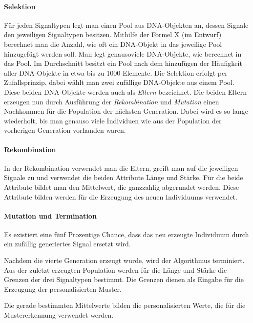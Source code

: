 \paragraph{Selektion}
F{\"u}r jeden Signaltypen legt man einen Pool aus DNA-Objekten an, dessen Signale den jeweiligen Signaltypen besitzen.
Mithilfe der Formel X (im Entwurf) berechnet man die Anzahl, wie oft ein DNA-Objekt in das jeweilige Pool hinzugef{\"u}gt werden soll. Man legt genausoviele DNA-Objekte, wie berechnet in das Pool. 
Im Durchschnitt besitzt ein Pool nach dem hinzuf{\"u}gen der H{\"a}ufigkeit aller DNA-Objekte in etwa bis zu 1000 Elemente.
Die Selektion erfolgt per Zufallsprinzip, dabei w{\"a}hlt man zwei zuf{\"a}llige DNA-Objekte aus einem Pool. Diese beiden DNA-Objekte werden auch als \textit{Eltern} bezeichnet. Die beiden Eltern erzeugen nun durch Ausf{\"u}hrung der \textit{Rekombination} und \textit{Mutation} einen Nachkommen f{\"u}r die Population der n{\"a}chsten Generation. Dabei wird es so lange wiederholt, bis man genauso viele Individuen wie aus der Population der vorherigen Generation vorhanden waren.

\paragraph{Rekombination}
In der Rekombination verwendet man die Eltern, greift man auf die jeweiligen Signale zu und verwendet die beiden Attribute L{\"a}nge und St{\"a}rke. 
F{\"u}r die beide Attribute bildet man den Mittelwert, die ganzzahlig abgerundet werden.
Diese Attribute bilden werden f{\"u}r die Erzeugung des neuen Individuums verwendet.

\paragraph{Mutation und Termination}
Es existiert eine f{\"u}nf Prozentige Chance, dass das neu erzeugte Individuum durch ein zuf{\"a}llig generiertes Signal ersetzt wird. 

Nachdem die vierte Generation erzeugt wurde, wird der Algorithmus terminiert. Aus der zuletzt erzeugten Population werden f{\"u}r die L{\"a}nge und St{\"a}rke die Grenzen der drei Signaltypen bestimmt. Die Grenzen dienen als Eingabe f{\"u}r die Erzeugung der personalisierten Muster. 


Die gerade bestimmten Mittelwerte bilden die personalisierten Werte, die f{\"u}r die Mustererkennung verwendet werden. 

